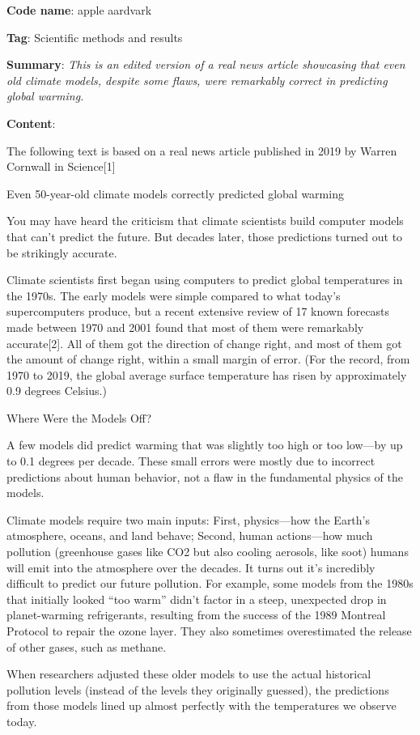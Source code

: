 \documentclass[
  letterpaper,
  DIV=11,
  numbers=noendperiod]{scrartcl}
\begin{document}
\textbf{Code name}: apple aardvark

\textbf{Tag}: Scientific methods and results

\textbf{Summary}: \emph{This is an edited version of a real news article
showcasing that even old climate models, despite some flaws, were
remarkably correct in predicting global warming.}

\textbf{Content}:

The following text is based on a real news article published in 2019 by
Warren Cornwall in Science{[}1{]}

Even 50-year-old climate models correctly predicted global warming

You may have heard the criticism that climate scientists build computer
models that can't predict the future. But decades later, those
predictions turned out to be strikingly accurate.

Climate scientists first began using computers to predict global
temperatures in the 1970s. The early models were simple compared to what
today's supercomputers produce, but a recent extensive review of 17
known forecasts made between 1970 and 2001 found that most of them were
remarkably accurate{[}2{]}. All of them got the direction of change
right, and most of them got the amount of change right, within a small
margin of error. (For the record, from 1970 to 2019, the global average
surface temperature has risen by approximately 0.9 degrees Celsius.)

Where Were the Models Off?

A few models did predict warming that was slightly too high or too
low---by up to 0.1 degrees per decade. These small errors were mostly
due to incorrect predictions about human behavior, not a flaw in the
fundamental physics of the models.

Climate models require two main inputs: First, physics---how the Earth's
atmosphere, oceans, and land behave; Second, human actions---how much
pollution (greenhouse gases like CO2 but also cooling aerosols, like
soot) humans will emit into the atmosphere over the decades. It turns
out it's incredibly difficult to predict our future pollution. For
example, some models from the 1980s that initially looked ``too warm''
didn't factor in a steep, unexpected drop in planet-warming
refrigerants, resulting from the success of the 1989 Montreal Protocol
to repair the ozone layer. They also sometimes overestimated the release
of other gases, such as methane.

When researchers adjusted these older models to use the actual
historical pollution levels (instead of the levels they originally
guessed), the predictions from those models lined up almost perfectly
with the temperatures we observe today.
\end{document}
